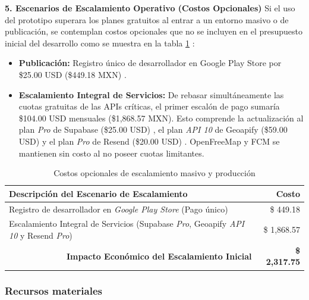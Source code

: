\textbf{5. Escenarios de Escalamiento Operativo (Costos Opcionales)}
Si el uso del prototipo superara los planes gratuitos al entrar a un entorno masivo o de publicación, se contemplan costos opcionales que no se incluyen en el presupuesto inicial del desarrollo como se muestra en la tabla \ref{tab:costos_opcionales} :
\begin{itemize}
    \item \textbf{Publicación:} Registro único de desarrollador en Google Play Store por \$25.00 USD (\$449.18 MXN) \cite{google_play_console}.
    \item \textbf{Escalamiento Integral de Servicios:} De rebasar simultáneamente las cuotas gratuitas de las APIs críticas, el primer escalón de pago sumaría \$104.00 USD mensuales (\$1,868.57 MXN). Esto comprende la actualización al plan \textit{Pro} de Supabase (\$25.00 USD) \cite{supabase_pricing}, el plan \textit{API 10} de Geoapify (\$59.00 USD) \cite{geoapify_pricing} y el plan \textit{Pro} de Resend (\$20.00 USD) \cite{resend_pricing}. OpenFreeMap y FCM se mantienen sin costo al no poseer cuotas limitantes.
\end{itemize}

\begin{table}[htbp]
    \centering
    \caption{Costos opcionales de escalamiento masivo y producción}
    \label{tab:costos_opcionales}
    \begin{tabular}{|p{}|r|}
        \hline
        \textbf{Descripción del Escenario de Escalamiento} & \textbf{Costo} \\ \hline
        Registro de desarrollador en \textit{Google Play Store} (Pago único) \cite{google_play_console} & \$ 449.18 \\ \hline
        Escalamiento Integral de Servicios (Supabase \textit{Pro}, Geoapify \textit{API 10} y Resend \textit{Pro}) \cite{supabase_pricing, geoapify_pricing, resend_pricing} & \$ 1,868.57 \\ \hline
        \multicolumn{1}{|r|}{\textbf{Impacto Económico del Escalamiento Inicial}} & \textbf{\$ 2,317.75} \\ \hline
    \end{tabular}
\end{table}


\subsubsection{Recursos materiales}


